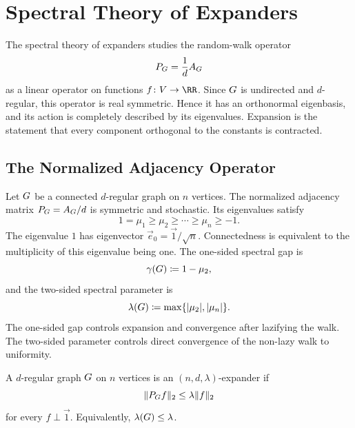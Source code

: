 \section{Spectral Theory of Expanders}
\label{sec:spectral-theory}

The spectral theory of expanders studies the random-walk operator
\begin{equation}
	P_{G}=\frac{1}{d}A_{G}
\end{equation}
as a linear operator on functions \(f\colon \Vertices\to\RR\). Since \(G\) is undirected and \(d\)-regular, this operator is real symmetric. Hence it has an orthonormal eigenbasis, and its action is completely described by its eigenvalues. Expansion is the statement that every component orthogonal to the constants is contracted.

\subsection{The Normalized Adjacency Operator}
\label{subsec:spectrum}

Let \(G\) be a connected \(d\)-regular graph on \(n\) vertices. The normalized adjacency matrix \(P_{G}=A_{G}/d\) is symmetric and stochastic. Its eigenvalues satisfy
\begin{equation}
	1=\mu_1\geq \mu_2\geq \cdots\geq \mu_n\geq -1.
\end{equation}
The eigenvalue \(1\) has eigenvector \(\vec{e}_0=\vec{1}/\sqrt{n}\). Connectedness is equivalent to the multiplicity of this eigenvalue being one. The one-sided spectral gap is
\begin{equation}
	\gamma(G)\coloneqq 1-\mu_2,
\end{equation}
and the two-sided spectral parameter is
\begin{equation}
	\lambda(G)\coloneqq \max\{\lvert\mu_2\rvert,\lvert\mu_n\rvert\}.
\end{equation}
The one-sided gap controls expansion and convergence after lazifying the walk. The two-sided parameter controls direct convergence of the non-lazy walk to uniformity.

\begin{definition}
	\label{def:spectral-expander}
	A \(d\)-regular graph \(G\) on \(n\) vertices is an \((n,d,\lambda)\)-expander if
	\begin{equation}
		\lVert P_{G}f\rVert_2\leq \lambda\lVert f\rVert_2
	\end{equation}
	for every \(f\perp\vec{1}\). Equivalently, \(\lambda(G)\leq\lambda\).
\end{definition}

